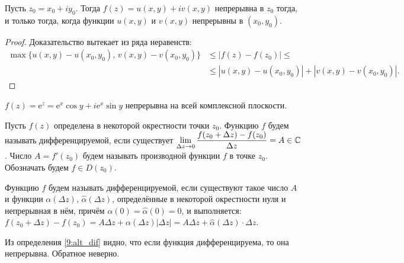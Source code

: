 \begin{statement}
Пусть \(z_0 = x_0 + iy_0\). Тогда \(f(z) = u(x, y) +iv(x,y)\) непрерывна в \(z_0\) тогда, и только
тогда, когда функции \(u(x, y)\) и \(v(x, y)\) непрерывны в \((x_0, y_0)\).
\end{statement}

\begin{proof}
Доказательство вытекает из ряда неравенств:
\begin{align}
    \max \{u(x,y) - u(x_0, y_0), \, v(x,y) - v(x_0, y_0)\}
    &\le |f(z) - f(z_0)| \le\\
    &\le |u(x,y) - u(x_0, y_0)| + |v(x,y) - v(x_0, y_0)|.
\end{align}
\end{proof}

\begin{example}
\(f(z) = \text{e}^z = \text{e}^x\cos{y} + i\text{e}^x\sin{y}\) непрерывна на всей комплексной
плоскости.
\end{example}



\begin{definition}
Пусть \(f(z)\) определена в некоторой окрестности точки \(z_0\). Функцию \(f\) будем называть
дифференцируемой, если существует \(\lim\limits_{\Delta z \to 0}
\dfrac{f(z_0 + \Delta z) - f(z_0)}{\Delta z} = A \in \mathbb{C}\). Число \(A = f'(z_0)\) будем называть
производной функции \(f\) в точке \(z_0\). Обозначать будем \(f \in D(z_0)\).
\end{definition}

\begin{definition}\label{9:alt_dif}
Функцию \(f\) будем называть дифференцируемой, если существуют такое число \(A\) и функции 
\(\alpha(\Delta z)\), \(\hat{\alpha}(\Delta z)\), определённые в некоторой окрестности нуля и 
непрерывная в нём, причём \(\alpha (0) = \hat{\alpha} (0) = 0\), и выполняется: \(f(z_0 + \Delta z) 
- f(z_0) = A\Delta z + \alpha (\Delta z) |\Delta z| = A\Delta z + \hat{\alpha}(\Delta z) \cdot
\Delta z\).
\end{definition}

\begin{note}
Из определения \ref{9:alt_dif} видно, что если функция дифференцируема, то она непрерывна. Обратное
неверно.
\end{note}

